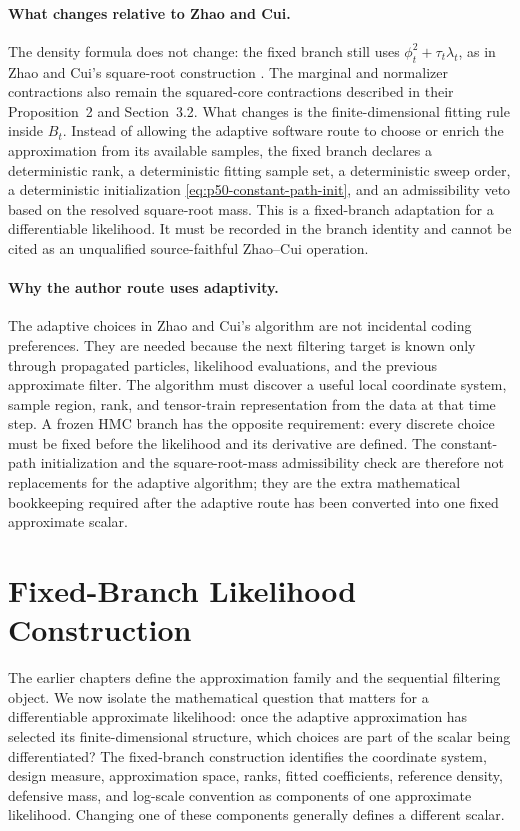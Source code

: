 \documentclass[11pt]{article}
\numberwithin{equation}{section}
\begin{document}
\paragraph{What changes relative to Zhao and Cui.}
The density formula does not change: the fixed branch still uses
\(\phi_t^2+\tau_t\lambda_t\), as in Zhao and Cui's square-root construction
\cite[Eq.~(13) and Algorithm~2]{zhao2024ttsequential}.  The marginal and
normalizer contractions also remain the squared-core contractions described in
their Proposition~2 and Section~3.2.  What changes is the finite-dimensional
fitting rule inside \(B_t\).  Instead of allowing the adaptive software route
to choose or enrich the approximation from its available samples, the fixed
branch declares a deterministic rank, a deterministic fitting sample set, a
deterministic sweep order, a deterministic initialization
\eqref{eq:p50-constant-path-init}, and an admissibility veto based on the
resolved square-root mass.  This is a fixed-branch adaptation for a
differentiable likelihood.  It must be recorded in the branch identity and
cannot be cited as an unqualified source-faithful Zhao--Cui operation.

\paragraph{Why the author route uses adaptivity.}
The adaptive choices in Zhao and Cui's algorithm are not incidental coding
preferences.  They are needed because the next filtering target is known only
through propagated particles, likelihood evaluations, and the previous
approximate filter.  The algorithm must discover a useful local coordinate
system, sample region, rank, and tensor-train representation from the data at
that time step.  A frozen HMC branch has the opposite requirement: every
discrete choice must be fixed before the likelihood and its derivative are
defined.  The constant-path initialization and the square-root-mass
admissibility check are therefore not replacements for the adaptive algorithm;
they are the extra mathematical bookkeeping required after the adaptive route
has been converted into one fixed approximate scalar.

\section{Fixed-Branch Likelihood Construction}

The earlier chapters define the approximation family and the sequential
filtering object.  We now isolate the mathematical question that matters for a
differentiable approximate likelihood: once the adaptive approximation has
selected its finite-dimensional structure, which choices are part of the scalar
being differentiated?  The fixed-branch construction identifies the
coordinate system, design measure, approximation space, ranks, fitted
coefficients, reference density, defensive mass, and log-scale convention as
components of one approximate likelihood.  Changing one of these components
generally defines a different scalar.
\end{document}
